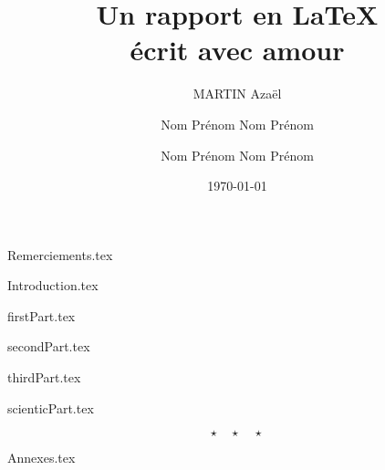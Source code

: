 \documentclass{rUTT}
\title{Un rapport en \LaTeX \\ écrit avec amour}
\date{\today}
\author{
    {\sc MARTIN} Azaël
    \and
    {\sc Nom} Prénom
    \break
    {\sc Nom} Prénom
    \and
    {\sc Nom} Prénom
    \break
    {\sc Nom} Prénom
    }
\begin{document}

    \frontpagereports %


    \clearpage

    \justifying

    {Remerciements.tex}
    
    \clearpage

    {Introduction.tex}

    \clearpage

    {firstPart.tex}

    \clearpage

    {secondPart.tex}

    \clearpage

    {thirdPart.tex}

    \clearpage

    {scienticPart.tex}

    \clearpage

    \[ \star \quad \star \quad \star \]

    {Annexes.tex}

    \clearpage


    {
    \RaggedRight %
    \sloppy
    \nocite{*} %
    \printbibliography[title={Bibliographie},heading=bibintoc]

    \clearpage

    \listoffigures
    \listoftables
    }


    \clearpage
    \setcounter{tocdepth}{10} %
    \tableofcontents
\end{document}

